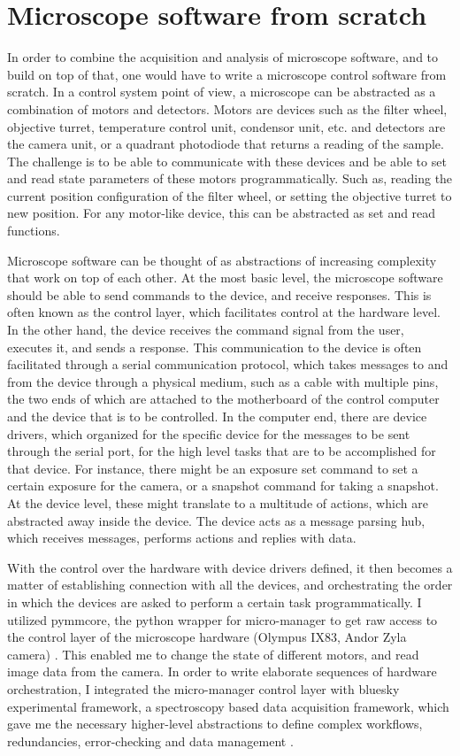 \section{Microscope software from scratch}
In order to combine the acquisition and analysis of microscope software, and to build on top of that, one would have to write a microscope control software from scratch. In a control system point of view, a microscope can be abstracted as a combination of motors and detectors. Motors are devices such as the filter wheel, objective turret, temperature control unit, condensor unit, etc. and detectors are the camera unit, or a quadrant photodiode that returns a reading of the sample. The challenge is to be able to communicate with these devices and be able to set and read state parameters of these motors programmatically. Such as, reading the current position configuration of the filter wheel, or setting the objective turret to new position. For any motor-like device, this can be abstracted as set and read functions.

Microscope software can be thought of as abstractions of increasing complexity that work on top of each other. At the most basic level, the microscope software should be able to send commands to the device, and receive responses. This is often known as the control layer, which facilitates control at the hardware level. In the other hand, the device receives the command signal from the user, executes it, and sends a response. This communication to the device is often facilitated through a serial communication protocol, which takes messages to and from the device through a physical medium, such as a cable with multiple pins, the two ends of which are attached to the motherboard of the control computer and the device that is to be controlled. In the computer end, there are device drivers, which organized for the specific device for the messages to be sent through the serial port, for the high level tasks that are to be accomplished for that device. For instance, there might be an exposure set command to set a certain exposure for the camera, or a snapshot command for taking a snapshot. At the device level, these might translate to a multitude of actions, which are abstracted away inside the device. The device acts as a message parsing hub, which receives messages, performs actions and replies with data.


With the control over the hardware with device drivers defined, it then becomes a matter of establishing connection with all the devices, and orchestrating the order in which the devices are asked to perform a certain task programmatically. I utilized pymmcore, the python wrapper for micro-manager to get raw access to the control layer of the microscope hardware (Olympus IX83, Andor Zyla camera) \cite{edelstein2014advanced}. This enabled me to change the state of different motors, and read image data from the camera. In order to write elaborate sequences of hardware orchestration, I integrated the micro-manager control layer with bluesky experimental framework, a spectroscopy based data acquisition framework, which gave me the necessary higher-level abstractions to define complex workflows, redundancies, error-checking and data management \cite{allan2019bluesky}.


